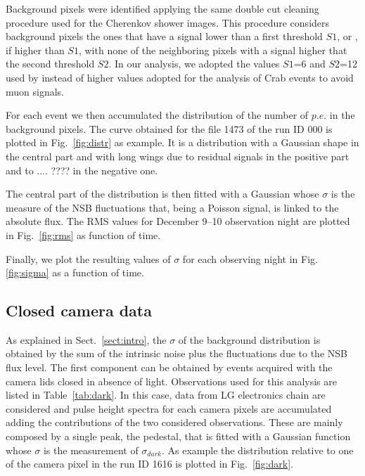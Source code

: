 


Background pixels were identified applying the same double cut cleaning procedure used for the Cherenkov shower images. This procedure considers background pixels the ones that have a signal lower than a first threshold $S1$, or , if higher than $S1$, with none of the neighboring pixels with a signal higher that the second threshold $S2$. In our analysis, we adopted the values $S1$=6 and $S2$=12 used by \cite{Mineo2019} instead of higher values adopted for the analysis of Crab events \citep{Lombardi2020} to avoid muon signals.

For each event we then accumulated the distribution of the number of $p.e.$ in the background pixels. The curve obtained for the file 1473 of the run ID 000 is plotted in Fig.~\ref{fig:distr} as example. It is a distribution with a Gaussian shape in the central part and with long wings due to residual signals in the positive part and to .... ???? in the negative one. 

The central part of the distribution is then fitted with a Gaussian whose $\sigma$ is the measure of the NSB fluctuations that, being a Poisson signal, is linked to the absolute flux. The RMS values for December 9--10 observation night are plotted in Fig.~\ref{fig:rms} as function of time.

Finally, we plot the resulting values of $\sigma$ for each observing night in Fig.\ref{fig:sigma}  as a function of time. 


\subsection{Closed camera data} 

As explained in Sect.~\ref{sect:intro}, the $\sigma$ of the background distribution is obtained by the sum of the intrinsic noise plus the fluctuations due to the NSB flux level. The first component can be obtained by events acquired with the camera lids closed in absence of light.
Observations used for this analysis are listed in Table~\ref{tab:dark}. In this case, data from LG electronics chain are considered and pulse height spectra for each camera pixels are accumulated adding the contributions of the two considered observations. These are mainly composed by a single peak, the pedestal, that is fitted with a Gaussian function whose $\sigma$ is the measurement of $\sigma_{dark}$. As example the distribution relative to one of the camera pixel in the run ID 1616 is plotted in Fig.~\ref{fig:dark}.


